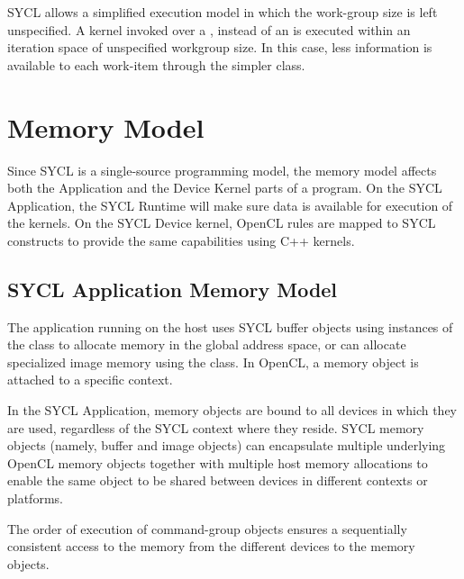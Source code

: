 SYCL allows a simplified execution model in which the work-group size
is left unspecified. A kernel invoked over a ,
instead of an  is executed within an iteration
space of unspecified workgroup size. In this case, less information is
available to each work-item through the simpler 
class.

\section{Memory Model}
\label{sec:memory.model}

Since SYCL is a single-source programming model, the memory model affects both
the Application and the Device Kernel parts of a program.
On the SYCL Application, the SYCL Runtime will make sure data is available
for execution of the kernels. 
On the SYCL Device kernel, OpenCL rules are mapped to SYCL constructs
to provide the same capabilities using C++ kernels.

\subsection{SYCL Application Memory Model}
\label{sub.section.memmodel.app}

The application running on the host uses SYCL \gls{buffer} objects using instances of
the  class to allocate memory in the global address
space, or can allocate specialized image memory using the
 class. 
In OpenCL, a memory object is attached to a specific context. 

In the SYCL Application, memory objects are bound to all devices in which
they are used, regardless of the SYCL context where they reside.
SYCL memory objects (namely, \gls{buffer} and \gls{image} objects) 
can encapsulate multiple underlying OpenCL memory objects together with
multiple host memory allocations to enable the same object to be shared
between devices in different contexts or platforms.

The order of execution of \gls{command-group} objects ensures a sequentially
consistent access to the memory from the different devices to the memory
objects.

